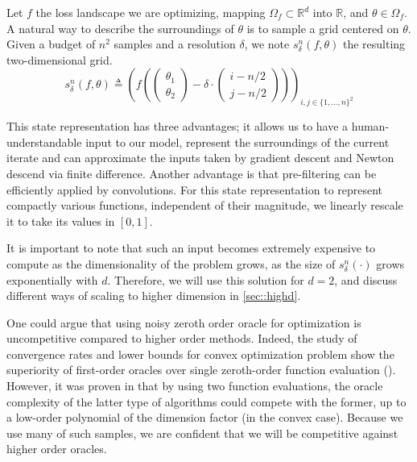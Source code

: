 		Let $f$ the loss landscape we are optimizing, mapping $\Omega_f \subset \mathbb{R}^d$ into $\mathbb{R}$, and $\theta \in\Omega_f$. A natural way to describe the surroundings of $\theta$ is to sample a grid centered on $\theta$. Given a budget of $n^2$ samples and a resolution $\delta$, we note $s_\delta^n(f,\theta)$ the resulting two-dimensional grid.
		\begin{equation}
				s_\delta^n(f,\theta) \triangleq \left(f \left( \begin{pmatrix} \theta_1 \\ \theta_2 \end{pmatrix} - \delta\cdot\begin{pmatrix} i - n/2 \\ j-n/2\end{pmatrix}\right)\right)_{i,j\in \{1,\hdots,n\}^2}
		\end{equation}
		
		This state representation has three advantages; it allows us to have a human-understandable input to our model, represent the surroundings of the current iterate and can approximate the inputs taken by gradient descent and Newton descend via finite difference. Another advantage is that pre-filtering can be efficiently applied by convolutions. For this state representation to represent compactly various functions, independent of their magnitude, we linearly rescale it to take its values in $[0,1]$.
			
		It is important to note that such an input becomes extremely expensive to compute as the dimensionality of the problem grows, as the size of $s_\delta^n(\cdot)$ grows exponentially with $d$. Therefore, we will use this solution for $d=2$, and discuss different ways of scaling to higher dimension in \ref{sec::highd}. 
			
		One could argue that using noisy zeroth order oracle for optimization is uncompetitive compared to higher order methods. Indeed, the study of convergence rates and lower bounds for convex optimization problem show the superiority of first-order oracles over single zeroth-order function evaluation (\cite{nemirovskii1983problem}). However, it was proven in \cite{duchi2015optimal} that by using two function evaluations, the oracle complexity of the latter type of algorithms could compete with the former, up to a low-order polynomial of the dimension factor (in the convex case). Because we use many of such samples, we are confident that we will be competitive against higher order oracles.
			
